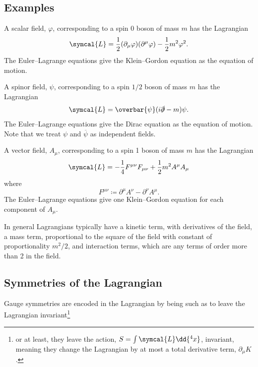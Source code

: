 \documentclass[fleqn]{NotesClass}
\newcommand{\diracadjoint}[1]{\overbar{#1}}
\newcommand{\lagrangianDensity}{\symcal{L}}
\begin{document}
    \subsection{Examples}
    A scalar field, \(\varphi\), corresponding to a spin 0 boson of mass \(m\) has the Lagrangian
    \begin{equation}
        \lagrangianDensity = \frac{1}{2}(\partial_\mu \varphi)(\partial^\mu \varphi) - \frac{1}{2}m^2 \varphi^2.
    \end{equation}
    The Euler--Lagrange equations give the Klein--Gordon equation as the equation of motion.
    
    A spinor field, \(\psi\), corresponding to a spin \(1/2\) boson of mass \(m\) has the Lagrangian
    \begin{equation}
        \lagrangianDensity = \diracadjoint{\psi}(i\slashed{\partial} - m)\psi.
    \end{equation}
    The Euler--Lagrange equations give the Dirac equation as the equation of motion.
    Note that we treat \(\psi\) and \(\diracadjoint{\psi}\) as independent fields.
    
    A vector field, \(A_\mu\), corresponding to a spin 1 boson of mass \(m\) has the Lagrangian
    \begin{equation}
        \lagrangianDensity = -\frac{1}{4}F^{\mu\nu}F_{\mu\nu} + \frac{1}{2}m^2 A^\mu A_\mu
    \end{equation}
    where
    \begin{equation}
        F^{\mu\nu} \coloneqq \partial^\mu A^\nu - \partial^\nu A^\mu.
    \end{equation}
    The Euler--Lagrange equations give one Klein--Gordon equation for each component of \(A_\mu\).
    
    In general Lagrangians typically have a kinetic term, with derivatives of the field, a mass term, proportional to the square of the field with constant of proportionality \(m^2/2\), and interaction terms, which are any terms of order more than 2 in the field.
    
    \subsection{Symmetries of the Lagrangian}
    Gauge symmetries are encoded in the Lagrangian by being such as to leave the Lagrangian invariant\footnote{or at least, they leave the action, \(S = \int \lagrangianDensity \dd{^4x}\), invariant, meaning they change the Lagrangian by at most a total derivative term, \(\partial_\mu K\).}
    
\end{document}
